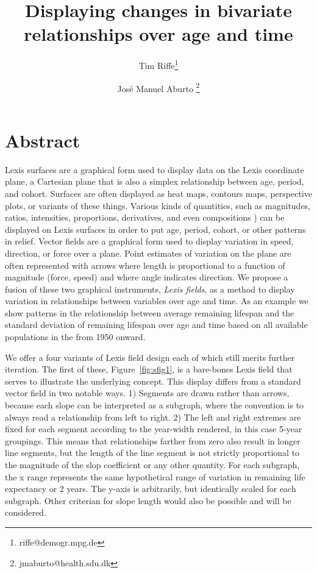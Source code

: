 \documentclass{article}
\begin{document}
\title{Displaying changes in bivariate relationships over age and time}

\author[1]{Tim Riffe\thanks{riffe@demogr.mpg.de}}
\author[2,3]{Jos\'e Manuel Aburto \thanks{jmaburto@health.sdu.dk}}

\maketitle

\section*{Abstract}
Lexis surfaces are a graphical form used to display data on the Lexis coordinate
plane, a Cartesian plane that is also a simplex relationship between age,
period, and cohort. Surfaces are often displayed as heat maps, contours maps,
perspective plots, or variants of these things. Various kinds of
quantities, such as magnitudes, ratios, intensities, proportions, derivatives,
and even compositions \citep{scholey2017visualizing}) can be displayed on Lexis 
surfaces in order to put age, period, cohort, or other patterns in relief. 
Vector fields are a graphical form used to display variation in speed,
direction, or force over a plane. Point estimates of variation on the plane are
often represented with arrows where length is proportional to a function of
magnitude (force, speed) and where angle indicates direction. We propose a
fusion of these two graphical instruments, \emph{Lexis fields}, as a method to
display variation in relationships between variables over age and time. As an
example we show patterns in the relationship between average remaining lifespan
and the standard deviation of remaining lifespan over age and time based on all
available populations in the \citet{HMD} from 1950 onward.

We offer a four variants of Lexis field design each of which still merits
further iteration. The first of these, Figure~\ref{fig:sfig1}, is a bare-bones Lexis
field that serves to illustrate the underlying concept. This display differs
from a standard vector field in two notable ways. 1) Segments are drawn rather than arrows, because each slope can be
interpreted as a subgraph, where the convention is to always read a
relationship from left to right. 2) The left and right extremes are fixed for
each segment according to the year-width rendered, in this case 5-year
groupings. This means that relationships farther from zero also result in longer
line segments, but the length of the line segment is not strictly proportional
to the magnitude of the slop coefficient or any other quantity. For each
subgraph, the x range represents the same hypothetical range of
variation in remaining life expectancy or 2 years. The y-axis is arbitrarily,
but identically scaled for each subgraph. Other criterian for slope length would
also be possible and will be considered.
\end{document}
